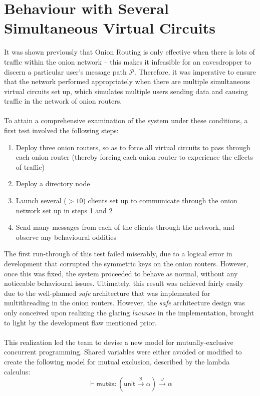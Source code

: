 \documentclass[10pt]{report}
\begin{document}
\section{Behaviour with Several Simultaneous Virtual Circuits}
It was shown previously that Onion Routing is only effective when there is lots of traffic within
the onion network -- this makes it infeasible for an eavesdropper to discern a particular user's
message path $\mathcal{P}$. Therefore, it was imperative to ensure that the network performed
appropriately when there are multiple simultaneous virtual circuits set up, which simulates multiple
users sending data and causing traffic in the network of onion routers.\\\\
To attain a comprehensive examination of the system under these conditions, a first test involved
the following steps:
\begin{enumerate}
	\item Deploy three onion routers, so as to force all virtual circuits to pass through each onion
		router (thereby forcing each onion router to experience the effects of traffic)
	\item Deploy a directory node
	\item Launch several ($>10$) clients set up to communicate through the onion network set up in
		steps 1 and 2
	\item Send many messages from each of the clients through the network, and observe any
		behavioural oddities
\end{enumerate}
The first run-through of this test failed miserably, due to a logical error in development that
corrupted the symmetric keys on the onion routers. However, once this was fixed, the system
proceeded to behave as normal, without any noticeable behavioural issues. Ultimately, this result
was achieved fairly easily due to the well-planned \textit{safe} architecture that was implemented
for multithreading in the onion routers. However, the \textit{safe} architecture design was only
conceived upon realizing the glaring \textit{lacunae} in the implementation, brought to light by the
development flaw mentioned prior.\\\\
This realization led the team to devise a new model for mutually-exclusive concurrent programming.
Shared variables were either avoided or modified to create the following model for mutual exclusion,
described by the lambda calculus:
\begin{equation}
	\vdash\mathsf{mutex}: (\mathsf{unit}\xrightarrow{\aleph}\alpha)\xrightarrow{\omega}\alpha
\end{equation}
\end{document}
